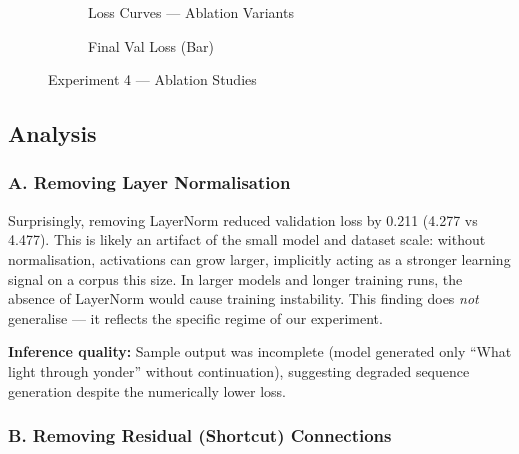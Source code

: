 \documentclass[12pt,a4paper]{article}
\begin{document}
\begin{figure}[H]
  \centering
  \begin{subfigure}{0.60\textwidth}
    \caption{Loss Curves — Ablation Variants}
  \end{subfigure}
  \hfill
  \begin{subfigure}{0.36\textwidth}
    \caption{Final Val Loss (Bar)}
  \end{subfigure}
  \caption{Experiment 4 — Ablation Studies}
\end{figure}

\subsection{Analysis}

\subsubsection{A. Removing Layer Normalisation}

Surprisingly, removing LayerNorm reduced validation loss by 0.211 (4.277 vs 4.477). This is likely an artifact of the small model and dataset scale: without normalisation, activations can grow larger, implicitly acting as a stronger learning signal on a corpus this size. In larger models and longer training runs, the absence of LayerNorm would cause training instability. This finding does \textit{not} generalise — it reflects the specific regime of our experiment.

\textbf{Inference quality:} Sample output was incomplete (model generated only ``What light through yonder'' without continuation), suggesting degraded sequence generation despite the numerically lower loss.

\subsubsection{B. Removing Residual (Shortcut) Connections}
\end{document}
